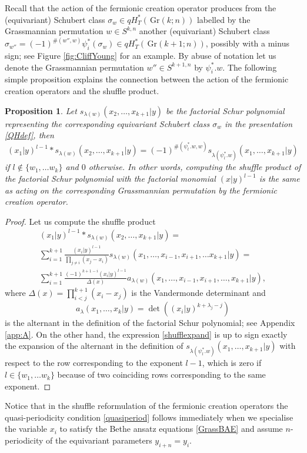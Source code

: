\documentclass[12pt]{amsart}
\newcommand{\Gr}{\,\mathrm{Gr}}
\newtheorem{prop}{Proposition}[section]
\numberwithin{equation}{section}
\numberwithin{figure}{section}
\begin{document}
Recall that the action of the fermionic creation operator produces from the (equivariant) Schubert class $\sigma_w\in qH_T^*(\Gr(k;n))$ labelled by the Grassmannian permutation $w\in S^{k,n}$ another (equivariant) Schubert class $\sigma_{w''}=(-1)^{\#(w'',w)}\psi^*_i(\sigma_w)\in qH^*_T(\Gr(k+1;n))$, possibly with a minus sign; see Figure \ref{fig:CliffYoung} for an example. By abuse of notation let us denote the Grassmannian permutation $w''\in S^{k+1,n}$ by $\psi_i^*.w$. The following simple proposition explains the connection between the action of the fermionic creation operators and the shuffle product.
\begin{prop}
    Let $s_{\lambda(w)}(x_2, \ldots, x_{k + 1}|y)$ be the factorial Schur polynomial representing the corresponding equivariant Schubert class $\sigma_w$ in the presentation \eqref{QHdef}, then
    \begin{equation}\label{simpleshuffle}
        (x_1|y)^{l-1} \ast s_{\lambda(w)}(x_2, \ldots, x_{k + 1}|y) = 
        (-1)^{\# (\psi_l^*.w,w)}s_{\lambda(\psi^*_{l}.w)} (x_1, \ldots, x_{k + 1}|y)
    \end{equation}
    if $l \notin \{w_1, \ldots w_k \}$ and $0$ otherwise. In other words, computing the shuffle product of the factorial Schur polynomial with the factorial monomial $(x|y)^{l-1}$ is the same as acting on the corresponding Grassmannian permutation by the fermionic creation operator.
\end{prop}
\begin{proof}
    Let us compute the shuffle product 
    \begin{multline}\label{shufflexpand}
        (x_1|y)^{l-1} \ast s_{\lambda(w)}(x_2, \ldots, x_{k + 1}|y) =\\ \sum\limits_{i = 1}^{k + 1} \frac{(x_i | y)^{l - 1}}{\prod\limits_{j \neq i}(x_j - x_i)} s_{\lambda(w)} (x_1, \ldots, x_{i - 1}, x_{i + 1}, \ldots x_{k + 1}|y)=\\
         \sum\limits_{i = 1}^{k + 1}\frac{(-1)^{k + 1 - i}(x_i|y)^{l - 1}}{\Delta(x)} a_{\lambda(w)}(x_1, \ldots, x_{i - 1}, x_{i + 1}, \ldots, x_{k+1}|y),
    \end{multline}
    where $\Delta(x)= \prod\limits_{i<j}^{k + 1}(x_i - x_j)$ is the Vandermonde determinant and 
    \[
    a_{\lambda}(x_1, \dots, x_k|y) = \det((x_i|y)^{k + \lambda_j - j})
    \]
    is the alternant in the definition of the factorial Schur polynomial; see Appendix \ref{app:A}. On the other hand, the expression \eqref{shufflexpand} is up to sign exactly the expansion of the alternant in the definition of $s_{\lambda(\psi^*_l.w)}(x_1, \ldots, x_{k+1}|y)$ with respect to the row corresponding to the exponent $l-1$, which is zero if $l \in \{ w_1, \ldots w_k \}$ because of two coinciding rows corresponding to the same exponent.
\end{proof}
\noindent Notice that in the shuffle reformulation of the fermionic creation operators the quasi-periodicity condition \eqref{quasiperiod} follows immediately when we specialise the variable $x_i$ to satisfy the Bethe ansatz equations \eqref{GrassBAE} and assume $n$-periodicity of the equivariant parameters $y_{i + n} = y_i$.
\end{document}
